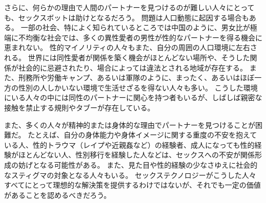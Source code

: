 \documentclass[paper=a4,book,openany]{jlreq}
\begin{document}
さらに、何らかの理由で人間のパートナーを見つけるのが難しい人々にとっても、セックスボットは助けとなるだろう。
問題は人口動態に起因する場合もある。
一部の社会、特によく知られているところでは中国のように、男女比が極端に不均衡な社会では、多くの異性愛者の男性が性的なパートナーを得る機会に恵まれない。
性的マイノリティの人々もまた、自分の周囲の人口環境に左右される。
世界には同性愛者が関係を築く機会がほとんどない場所や、そうした関係が社会的に忌避されたり、場合によっては違法とされる地域が存在する。
また、刑務所や労働キャンプ、あるいは軍隊のように、まったく、あるいはほぼ一方の性別の人しかいない環境で生活せざるを得ない人々も多い。
こうした環境にいる人々の中には同性のパートナーに関心を持つ者もいるが、しばしば親密な接触を禁止する規則やタブーが存在している。

また、多くの人々が精神的または身体的な理由でパートナーを見つけることが困難だ。
たとえば、自分の身体能力や身体イメージに関する重度の不安を抱えている人、性的トラウマ（レイプや近親姦など）の経験者、成人になっても性的経験がほとんどない人、性別移行を経験した人などは、セックスへの不安が関係形成の妨げとなる可能性がある。
また、見た目や性的経験の少なさゆえに社会的なスティグマの対象となる人々もいる。
セックステクノロジーがこうした人々すべてにとって理想的な解決策を提供するわけではないが、それでも一定の価値があることを認めるべきだろう。
\end{document}
